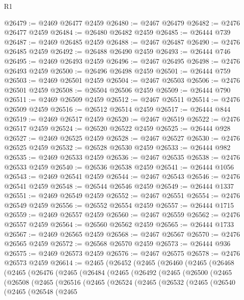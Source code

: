 \begin{lexlean}{R1}
\begin{coremodule}
@26479 := @2469 @26477 @2459
@26480 := @2467 @26479
@26482 := @2476 @26477 @2459
@26484 := @26480 @26482 @2459
@26485 := @26444 @739
@26487 := @2469 @26485 @2459
@26488 := @2467 @26487
@26490 := @2476 @26485 @2459
@26492 := @26488 @26490 @2459
@26493 := @26444 @746
@26495 := @2469 @26493 @2459
@26496 := @2467 @26495
@26498 := @2476 @26493 @2459
@26500 := @26496 @26498 @2459
@26501 := @26444 @759
@26503 := @2469 @26501 @2459
@26504 := @2467 @26503
@26506 := @2476 @26501 @2459
@26508 := @26504 @26506 @2459
@26509 := @26444 @790
@26511 := @2469 @26509 @2459
@26512 := @2467 @26511
@26514 := @2476 @26509 @2459
@26516 := @26512 @26514 @2459
@26517 := @26444 @844
@26519 := @2469 @26517 @2459
@26520 := @2467 @26519
@26522 := @2476 @26517 @2459
@26524 := @26520 @26522 @2459
@26525 := @26444 @928
@26527 := @2469 @26525 @2459
@26528 := @2467 @26527
@26530 := @2476 @26525 @2459
@26532 := @26528 @26530 @2459
@26533 := @26444 @982
@26535 := @2469 @26533 @2459
@26536 := @2467 @26535
@26538 := @2476 @26533 @2459
@26540 := @26536 @26538 @2459
@26541 := @26444 @1056
@26543 := @2469 @26541 @2459
@26544 := @2467 @26543
@26546 := @2476 @26541 @2459
@26548 := @26544 @26546 @2459
@26549 := @26444 @1337
@26551 := @2469 @26549 @2459
@26552 := @2467 @26551
@26554 := @2476 @26549 @2459
@26556 := @26552 @26554 @2459
@26557 := @26444 @1715
@26559 := @2469 @26557 @2459
@26560 := @2467 @26559
@26562 := @2476 @26557 @2459
@26564 := @26560 @26562 @2459
@26565 := @26444 @1733
@26567 := @2469 @26565 @2459
@26568 := @2467 @26567
@26570 := @2476 @26565 @2459
@26572 := @26568 @26570 @2459
@26573 := @26444 @936
@26575 := @2469 @26573 @2459
@26576 := @2467 @26575
@26578 := @2476 @26573 @2459
@26614 := @2465
    (@26452
      (@2465
        (@26460
          (@2465
            (@26468
              (@2465
                (@26476
                  (@2465
                    (@26484
                      (@2465
                        (@26492
                          (@2465
                            (@26500
                              (@2465
                                (@26508
                                  (@2465
                                    (@26516
                                      (@2465
                                        (@26524
                                          (@2465
                                            (@26532
                                              (@2465
                                                (@26540
                                                  (@2465
                                                    (@26548
                                                      (@2465

\end{coremodule}
\end{lexlean}

